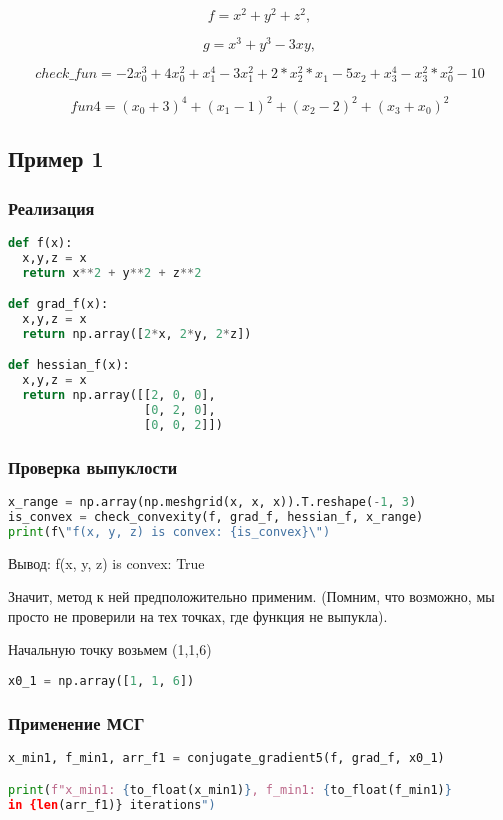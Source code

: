 \documentclass{article}
\begin{document}
$$f = x^2 + y^2 + z^2,$$

$$g = x^3 + y^3 - 3xy,$$

$$check\_fun = -2x_0^3 + 4x_0^2 + x_1^4 - 3x_1^2 + 2*x_2^2 * x_1 - 5x_2 + x_3^4 - x_3^2 * x_0^2 - 10$$

$$fun4 = (x_0+3)^4 + (x_1-1)^2 + (x_2-2)^2 + (x_3+x_0)^2$$

\subsection{Пример 1}

\subsubsection{Реализация}
\begin{lstlisting}[language=Python]
def f(x):
  x,y,z = x
  return x**2 + y**2 + z**2

def grad_f(x):
  x,y,z = x
  return np.array([2*x, 2*y, 2*z])

def hessian_f(x):
  x,y,z = x
  return np.array([[2, 0, 0],
                   [0, 2, 0],
                   [0, 0, 2]])
\end{lstlisting}

\subsubsection{Проверка выпуклости}
\begin{lstlisting}[language=Python]
x_range = np.array(np.meshgrid(x, x, x)).T.reshape(-1, 3)
is_convex = check_convexity(f, grad_f, hessian_f, x_range)
print(f\"f(x, y, z) is convex: {is_convex}\")
\end{lstlisting}

Вывод: f(x, y, z) is convex: True

Значит, метод к ней предположительно применим. (Помним, что возможно, мы просто не проверили на тех точках, где функция не выпукла).

Начальную точку возьмем (1,1,6)

\begin{lstlisting}[language=Python]
x0_1 = np.array([1, 1, 6])
\end{lstlisting}

\newpage
\subsubsection{Применение МСГ}

\begin{lstlisting}[language=Python]
x_min1, f_min1, arr_f1 = conjugate_gradient5(f, grad_f, x0_1)

print(f"x_min1: {to_float(x_min1)}, f_min1: {to_float(f_min1)}
in {len(arr_f1)} iterations")
\end{lstlisting}
\end{document}
